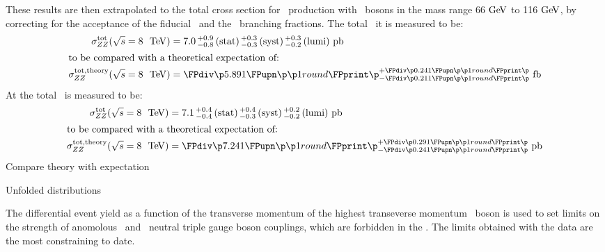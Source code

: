 These results are then extrapolated to the total cross section for \ZZ\
production with \Z\ bosons in the mass range 66$\GeV$ to 116$\GeV$, by
correcting for the acceptance of the fiducial \phasespace\ and the \Zll\
branching fractions. The total \cx\ it  is measured to be:
\begin{align}
\sigmaTotZZ(\sqrtseq{8}) &= \ZZSevenTeVTotalCrossSection \\
\intertext{to be compared with a theoretical expectation of:}
\sigmaTotTheoryZZ() &= \ZZSevenTeVTheoryTotalCrossSection
\end{align}
At \sqrtseq{8} the total \cx\ is measured to be:
\begin{align}
\sigmaTotZZ(\sqrtseq{8}) &= \ZZEightTeVTotalCrossSection \\
\intertext{to be compared with a theoretical expectation of:}
\sigmaTotTheoryZZ(\sqrtseq{8}) &= \ZZEightTeVTheoryTotalCrossSection
\end{align}
Compare theory with expectation

Unfolded distributions

The differential event yield as a function of the transverse momentum of the
highest transeverse momentum \Z\ boson is used to set limits on the strength of
anomolous \ZZZ\ and \ZZg\ neutral triple gauge boson couplings, which are
forbidden in the \sm. 
The limits obtained with the \sqrtseq{8} data are the most constraining to date.
